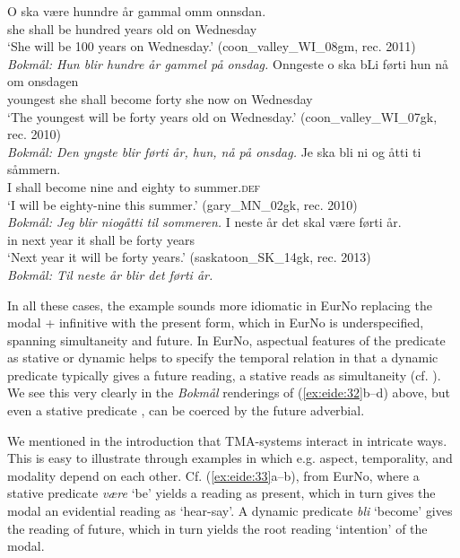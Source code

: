 \documentclass[output=paper]{langscibook}
\begin{document}
\ea%
    \label{ex:eide:32}
    \ea \label{ex:eide:32a} 
    \gll O ska være hunndre år gammal omm onnsdan.    \\
         she shall be hundred years old on Wednesday    \\
    \glt ‘She will be 100 years on Wednesday.’ 
    ({{coon\_valley\_WI\_08gm}}, rec. 2011)\\
         \textit{Bokmål: Hun blir hundre år gammel på onsdag.} 
    \ex \label{ex:eide:32b} 
    \gll Onngeste o ska bLi førti hun nå om onsdagen\\
         youngest she shall become forty she now on Wednesday   \\
    \glt ‘The youngest will be forty years old on Wednesday.’ ({{coon\_valley\_WI\_07gk}}, rec. 2010)\\
         \textit{Bokmål: Den yngste blir førti år, hun, nå på onsdag.} 
    \ex \label{ex:eide:32c} 
    \gll Je ska bli ni og åtti ti såmmern.                            \\
         I shall become nine and eighty to summer.\textsc{def}     \\
    \glt ‘I will be eighty-nine this summer.’ ({{gary\_MN\_02gk}}, rec. 2010)\\
         \textit{Bokmål: Jeg blir niogåtti til sommeren.} 
    \ex \label{ex:eide:32d} 
    \gll I neste år det skal være førti år.        \\
         in next year it shall be forty years      \\
    \glt ‘Next year it will be forty years.’ ({{saskatoon\_SK\_14gk}}, rec. 2013)\\
         \textit{Bokmål: Til neste år blir det førti år.} 
    \z %
\z

In all these cases, the example sounds more idiomatic in EurNo replacing the modal + infinitive with the present form, which in EurNo is underspecified, spanning simultaneity and  future. In EurNo, aspectual features of the predicate as stative or dynamic helps to specify the temporal relation in that a dynamic predicate typically gives a future reading, a stative reads as simultaneity (cf. \citealt{Eide2002,Eide2005, Eide2012}). We see this very clearly in the \textit{Bokmål} renderings of (\ref{ex:eide:32}b--d) above, but even a stative predicate , can be coerced by the future adverbial. 

We mentioned in the introduction that TMA-systems interact in intricate ways. This is easy to illustrate through examples in which e.g. aspect, temporality, and modality depend on each other. Cf. (\ref{ex:eide:33}a--b), from EurNo, where a stative predicate \textit{være} ‘be’ yields a reading as present, which in turn gives the modal an evidential reading as ‘hear-say’. A dynamic predicate \textit{bli} ‘become’ gives the reading of future, which in turn yields the root reading ‘intention’ of the modal. 
\end{document}
